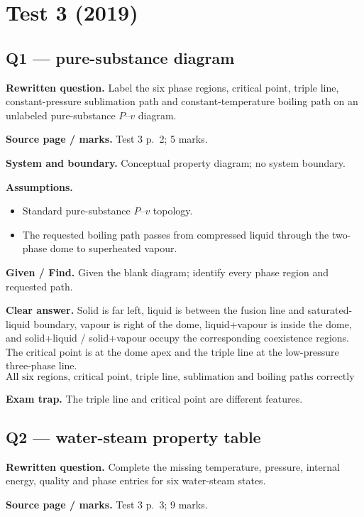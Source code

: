 \section*{Test 3 (2019)}

\subsection*{Q1 --- pure-substance diagram}
\textbf{Rewritten question.} Label the six phase regions, critical point, triple line, constant-pressure sublimation path and constant-temperature boiling path on an unlabeled pure-substance $P$--$v$ diagram.

\textbf{Source page / marks.} Test 3 p.~2; 5 marks.

\textbf{System and boundary.} Conceptual property diagram; no system boundary.

\textbf{Assumptions.}
\begin{itemize}
  \item Standard pure-substance $P$--$v$ topology.
  \item The requested boiling path passes from compressed liquid through the two-phase dome to superheated vapour.
\end{itemize}

\textbf{Given / Find.} Given the blank diagram; identify every phase region and requested path.


\textbf{Clear answer.} Solid is far left, liquid is between the fusion line and saturated-liquid boundary, vapour is right of the dome, liquid+vapour is inside the dome, and solid+liquid / solid+vapour occupy the corresponding coexistence regions. The critical point is at the dome apex and the triple line at the low-pressure three-phase line.
\[
\boxed{\text{All six regions, critical point, triple line, sublimation and boiling paths correctly located.}}
\]

\textbf{Exam trap.} The triple line and critical point are different features.

\subsection*{Q2 --- water-steam property table}
\textbf{Rewritten question.} Complete the missing temperature, pressure, internal energy, quality and phase entries for six water-steam states.

\textbf{Source page / marks.} Test 3 p.~3; 9 marks.

